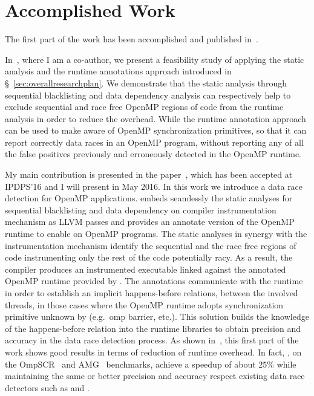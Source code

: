 \section{Accomplished Work}
\label{sec:accomplishedwork}

The first part of the work has been accomplished and published
in~\cite{Protze:2014:TPL:2688361.2688369, atzeni2016}.

In~\cite{Protze:2014:TPL:2688361.2688369}, where I am a co-author, we present
a feasibility study of applying the static analysis and the runtime
annotations approach introduced in \S~\ref{sec:overallresearchplan}.
%
We demonstrate that the static analysis through sequential blacklisting and
data dependency analysis can respectively help to exclude sequential and race
free OpenMP regions of code from the runtime analysis in order to reduce the
overhead.
%
While the runtime annotation approach can be used to make \tsan aware of
OpenMP synchronization primitives, so that it can report correctly data races
in an OpenMP program, without reporting any of all the false positives
previously and erroneously detected in the OpenMP runtime.

My main contribution is presented in the paper~\cite{atzeni2016}, which has
been accepted at IPDPS'16 and I will present in May 2016.
%
In this work we introduce \archer a data race detection for OpenMP applications.
%
\archer embeds seamlessly the static analyses for sequential blacklisting and
data dependency on \tsan compiler instrumentation mechanism as LLVM passes and
provides an annotate version of the OpenMP runtime to enable \tsan on OpenMP
programs.
%
The static analyses in synergy with the instrumentation mechanism identify the
sequential and the race free regions of code instrumenting only the rest of
the code potentially racy.
%
As a result, the compiler produces an instrumented executable linked against
the annotated OpenMP runtime provided by \archer.
%
The annotations communicate with the \tsan runtime in order to establish an
implicit happens-before relations, between the involved threads, in those
cases where the OpenMP runtime adopts synchronization primitive unknown by
\tsan (e.g.\ omp barrier, etc.).
%
This solution builds the knowledge of the happens-before relation into the
runtime libraries to obtain precision and accuracy in the data race detection
process.
%
As shown in~\cite{atzeni2016}, this first part of the work shows good results
in terms of reduction of runtime overhead.
%
In fact, \archer, on the OmpSCR~\cite{ompscr} and AMG~\cite{amg2013}
benchmarks, achieve a speedup of about $25\%$ while maintaining the same or
better precision and accuracy respect existing data race detectors such as
\insp and \tsan.

